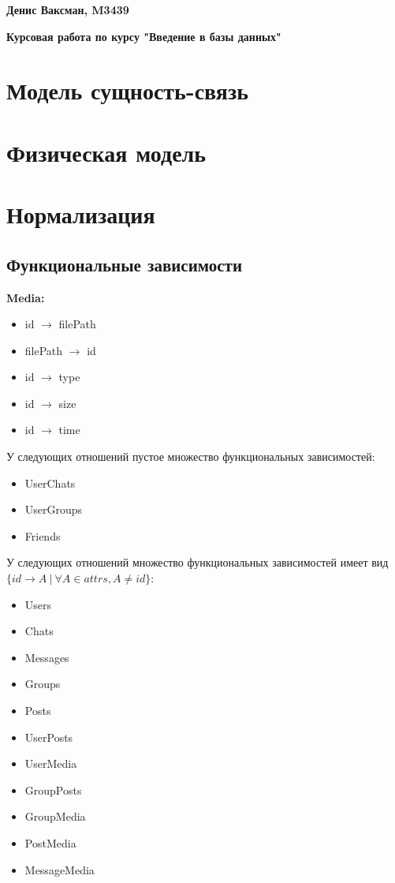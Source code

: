 \documentclass[12pt, a4paper] {ncc}
\begin{document}
\textbf{Денис Ваксман, M3439}


\textbf{Курсовая работа по курсу "Введение в базы данных"}


\section{Модель сущность-связь}
\section{Физическая модель}
\section{Нормализация}
\subsection{Функциональные зависимости}
\textbf{Media:}
\begin{itemize}
\item id $\rightarrow$ filePath
\item filePath $\rightarrow$ id
\item id $\rightarrow$ type
\item id $\rightarrow$ size
\item id $\rightarrow$ time
\end{itemize}
У следующих отношений пустое множество функциональных зависимостей:
\begin{itemize}
\item UserChats
\item UserGroups
\item Friends
\end{itemize}
У следующих отношений множество функциональных зависимостей имеет вид \\
$\{id \rightarrow A ~ | ~ \forall A \in \textit{attrs}, A \ne id\}$:
\begin{itemize}
\item Users
\item Chats
\item Messages
\item Groups
\item Posts
\item UserPosts
\item UserMedia
\item GroupPosts
\item GroupMedia
\item PostMedia
\item MessageMedia
\end{itemize}
\end{document}

